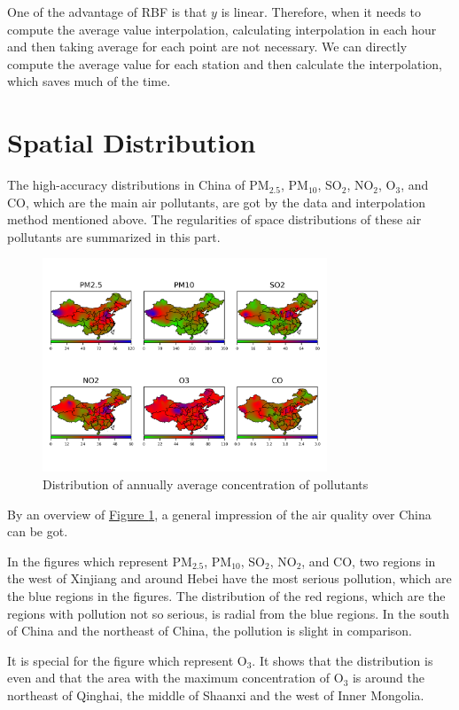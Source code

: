 \documentclass[letterpaper]{article}
\begin{document}
\begin{CJK*}{UTF8}{gkai}
  One of the advantage of RBF is that $y$ is linear. Therefore, when it needs to compute the average value interpolation, calculating interpolation in each hour and then taking average for each point are not necessary. We can directly compute the average value for each station and then calculate the interpolation, which saves much of the time.

  \section{Spatial Distribution}

  The high-accuracy distributions in China of PM$_{2.5}$, PM$_{10}$, SO$_{2}$, NO$_{2}$, O$_{3}$, and CO, which are the main air pollutants, are got by the data and interpolation method mentioned above. The regularities of space distributions of these air pollutants are summarized in this part.
  \begin{figure}[h]
    \includegraphics[width = 8.5cm]{Interpolation_from_20150102_to_20151231_linear.png}
    \caption{Distribution of annually average concentration of pollutants}
    \label{figure:1}
    \centering
  \end{figure}

  By an overview of \hyperref[figure:1]{Figure \ref*{figure:1}}, a general impression of the air quality over China can be got.

  In the figures which represent PM$_{2.5}$, PM$_{10}$, SO$_{2}$, NO$_{2}$, and CO, two regions in the west of Xinjiang and around Hebei have the most serious pollution, which are the blue regions in the figures. The distribution of the red regions, which are the regions with pollution not so serious, is radial from the blue regions. In the south of China and the northeast of China, the pollution is slight in comparison.

  It is special for the figure which represent O$_{3}$. It shows that the distribution is even and that the area with the maximum concentration of O$_{3}$ is around the northeast of Qinghai, the middle of Shaanxi and the west of Inner Mongolia.



\end{CJK*}
\end{document}
